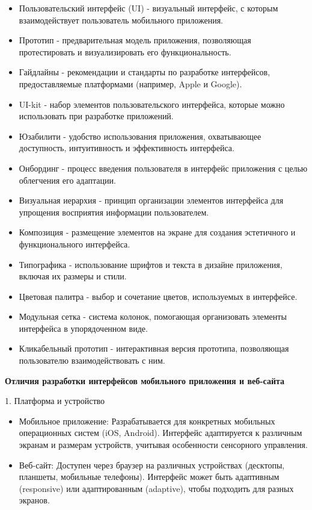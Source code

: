 \begin{itemize}
    \item Пользовательский интерфейс (UI) - визуальный интерфейс, с которым взаимодействует пользователь мобильного приложения.
    \item Прототип - предварительная модель приложения, позволяющая протестировать и визуализировать его функциональность.
    \item Гайдлайны - рекомендации и стандарты по разработке интерфейсов, предоставляемые платформами (например, Apple и Google).
    \item UI-kit - набор элементов пользовательского интерфейса, которые можно использовать при разработке приложений.
    \item Юзабилити - удобство использования приложения, охватывающее доступность, интуитивность и эффективность интерфейса.
    \item Онбординг - процесс введения пользователя в интерфейс приложения с целью облегчения его адаптации.
    \item Визуальная иерархия - принцип организации элементов интерфейса для упрощения восприятия информации пользователем.
    \item Композиция - размещение элементов на экране для создания эстетичного и функционального интерфейса.
    \item Типографика - использование шрифтов и текста в дизайне приложения, включая их размеры и стили.
    \item Цветовая палитра - выбор и сочетание цветов, используемых в интерфейсе.
    \item Модульная сетка - система колонок, помогающая организовать элементы интерфейса в упорядоченном виде.
    \item Кликабельный прототип - интерактивная версия прототипа, позволяющая пользователю взаимодействовать с ним.
\end{itemize}
\bigskip

\textbf{Отличия разработки интерфейсов мобильного приложения и веб-сайта}
\bigskip

1. Платформа и устройство

\begin{itemize}
    \item Мобильное приложение: Разрабатывается для конкретных мобильных операционных систем (iOS, Android). Интерфейс адаптируется к различным экранам и размерам устройств, учитывая особенности сенсорного управления.
    \item Веб-сайт: Доступен через браузер на различных устройствах (десктопы, планшеты, мобильные телефоны). Интерфейс может быть адаптивным (responsive) или адаптированным (adaptive), чтобы подходить для разных экранов.
\end{itemize}

